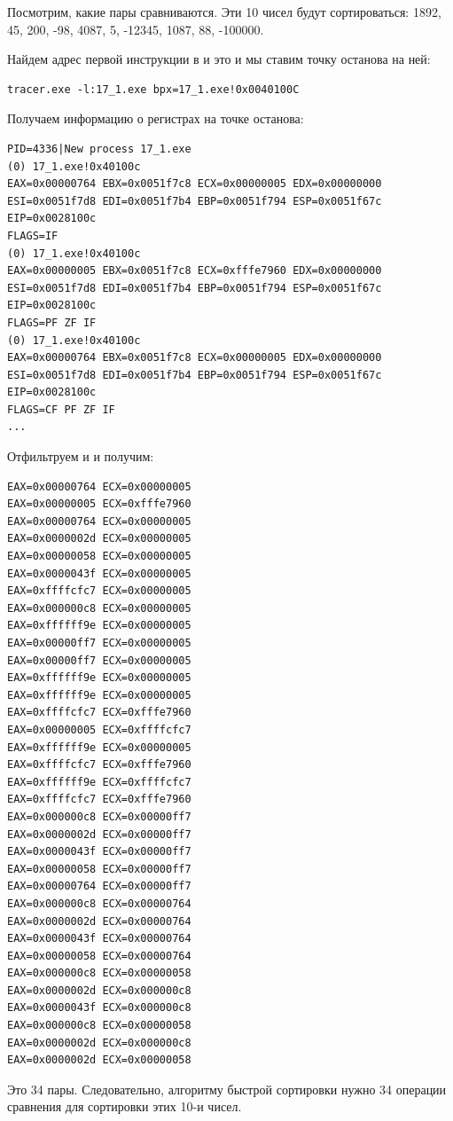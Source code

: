 Посмотрим, какие пары сравниваются.
Эти 10 чисел будут сортироваться: 
1892, 45, 200, -98, 4087, 5, -12345, 1087, 88, -100000.

Найдем адрес первой инструкции \CMP в \comp и это  и мы ставим точку останова на ней:%

\begin{lstlisting}
tracer.exe -l:17_1.exe bpx=17_1.exe!0x0040100C
\end{lstlisting}

Получаем информацию о регистрах на точке останова:

\begin{lstlisting}
PID=4336|New process 17_1.exe
(0) 17_1.exe!0x40100c
EAX=0x00000764 EBX=0x0051f7c8 ECX=0x00000005 EDX=0x00000000
ESI=0x0051f7d8 EDI=0x0051f7b4 EBP=0x0051f794 ESP=0x0051f67c
EIP=0x0028100c
FLAGS=IF
(0) 17_1.exe!0x40100c
EAX=0x00000005 EBX=0x0051f7c8 ECX=0xfffe7960 EDX=0x00000000
ESI=0x0051f7d8 EDI=0x0051f7b4 EBP=0x0051f794 ESP=0x0051f67c
EIP=0x0028100c
FLAGS=PF ZF IF
(0) 17_1.exe!0x40100c
EAX=0x00000764 EBX=0x0051f7c8 ECX=0x00000005 EDX=0x00000000
ESI=0x0051f7d8 EDI=0x0051f7b4 EBP=0x0051f794 ESP=0x0051f67c
EIP=0x0028100c
FLAGS=CF PF ZF IF
...
\end{lstlisting}

Отфильтруем  и  и получим:

\begin{lstlisting}
EAX=0x00000764 ECX=0x00000005
EAX=0x00000005 ECX=0xfffe7960
EAX=0x00000764 ECX=0x00000005
EAX=0x0000002d ECX=0x00000005
EAX=0x00000058 ECX=0x00000005
EAX=0x0000043f ECX=0x00000005
EAX=0xffffcfc7 ECX=0x00000005
EAX=0x000000c8 ECX=0x00000005
EAX=0xffffff9e ECX=0x00000005
EAX=0x00000ff7 ECX=0x00000005
EAX=0x00000ff7 ECX=0x00000005
EAX=0xffffff9e ECX=0x00000005
EAX=0xffffff9e ECX=0x00000005
EAX=0xffffcfc7 ECX=0xfffe7960
EAX=0x00000005 ECX=0xffffcfc7
EAX=0xffffff9e ECX=0x00000005
EAX=0xffffcfc7 ECX=0xfffe7960
EAX=0xffffff9e ECX=0xffffcfc7
EAX=0xffffcfc7 ECX=0xfffe7960
EAX=0x000000c8 ECX=0x00000ff7
EAX=0x0000002d ECX=0x00000ff7
EAX=0x0000043f ECX=0x00000ff7
EAX=0x00000058 ECX=0x00000ff7
EAX=0x00000764 ECX=0x00000ff7
EAX=0x000000c8 ECX=0x00000764
EAX=0x0000002d ECX=0x00000764
EAX=0x0000043f ECX=0x00000764
EAX=0x00000058 ECX=0x00000764
EAX=0x000000c8 ECX=0x00000058
EAX=0x0000002d ECX=0x000000c8
EAX=0x0000043f ECX=0x000000c8
EAX=0x000000c8 ECX=0x00000058
EAX=0x0000002d ECX=0x000000c8
EAX=0x0000002d ECX=0x00000058
\end{lstlisting}

Это 34 пары.
Следовательно, алгоритму быстрой сортировки нужно 34 операции сравнения для сортировки этих 10-и чисел.

